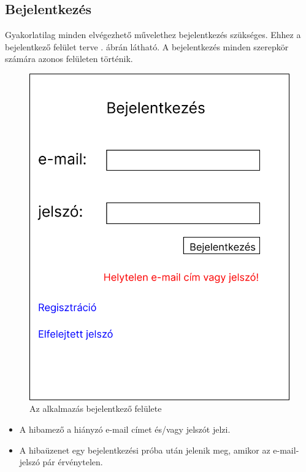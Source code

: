 \documentclass[a4paper,12pt]{article}
\begin{document}
\subsection{Bejelentkezés}

Gyakorlatilag minden elvégezhető művelethez bejelentkezés szükséges. Ehhez a bejelentkező felület terve . ábrán látható. A bejelentkezés minden szerepkör számára azonos felületen történik.

\begin{figure}[h!]
	\centering
	\includegraphics[scale=0.4]{images/Web_pages/Login.jpg}
	\caption{Az alkalmazás bejelentkező felülete}
	\label{fig:Login}
\end{figure}

\begin{itemize}
	\item A hibamező a hiányzó e-mail címet és/vagy jelszót jelzi.
	\item A hibaüzenet egy bejelentkezési próba után jelenik meg, amikor az e-mail-jelszó pár érvénytelen.
\end{itemize}
\end{document}

